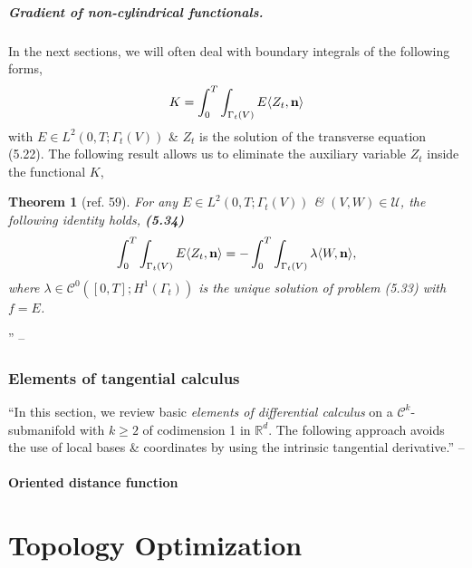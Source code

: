 \documentclass[oneside]{book}
\numberwithin{equation}{section}
\newtheorem{theorem}{Theorem}[chapter]
\begin{document}
\paragraph{Gradient of non-cylindrical functionals.} In the next sections, we will often deal with boundary integrals of the following forms,
\begin{align*}
	K = \int_0^T\int_{\Gamma_t(V)} E\langle Z_t,{\bf n}\rangle
\end{align*}
with $E\in L^2(0,T;\Gamma_t(V))$ \& $Z_t$ is the solution of the transverse equation (5.22). The following result allows us to eliminate the auxiliary variable $Z_t$ inside the functional $K$,

\begin{theorem}[ref. 59]
	For any $E\in L^2(0,T;\Gamma_t(V))$ \& $(V,W)\in\mathcal{U}$, the following identity holds, \textbf{(5.34)}
	\begin{align*}
		\int_0^T\int_{\Gamma_t(V)} E\langle Z_t,{\bf n}\rangle = -\int_0^T\int_{\Gamma_t(V)} \lambda\langle W,{\bf n}\rangle,
	\end{align*}
	where $\lambda\in\mathcal{C}^0([0,T];H^1(\Gamma_t))$ is the unique solution of problem (5.33) with $f = E$.
\end{theorem}
'' -- \cite[Chap. 5, Subsect. 5.3.1, pp. 114--118]{Moubachir_Zolesio2006}

\subsection{Elements of tangential calculus}
``In this section, we review basic \textit{elements of differential calculus} on a $\mathcal{C}^k$-submanifold with $k\ge 2$ of codimension 1 in $\mathbb{R}^d$. The following approach avoids the use of local bases \& coordinates by using the intrinsic tangential derivative.'' -- \cite[Chap. 5, Sect. 5.4, pp. 119]{Moubachir_Zolesio2006}

\subsubsection{Oriented distance function}


\chapter{Topology Optimization}


\printbibliography[heading=bibintoc]
	
\end{document}
